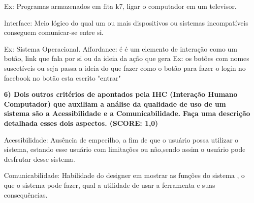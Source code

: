 \documentclass[
	article,			%
	11pt,				%
	oneside,			%
	a4paper,			%
	english,			%
	brazil,				%
	sumario=tradicional
	]{abntex2}
\begin{document}
Ex: Programas armazenados em fita k7, ligar o computador em um televisor.

Interface: Meio lógico do qual um ou mais dispositivos ou sistemas incompatíveis conseguem comunicar-se entre si.

Ex:  Sistema Operacional.
Affordance:  é  é um elemento de interação como um botão, link que fala por si ou da ideia da ação que gera
Ex: os botões com nomes suscetíveis ou seja passa a ideia do que fazer como o botão para fazer o login no facebook no botão esta escrito "entrar"

\textbf{6) Dois outros critérios de apontados pela IHC (Interação Humano Computador) que auxiliam a análise da qualidade de uso de um sistema são a Acessibilidade e a Comunicabilidade. Faça uma descrição detalhada esses dois aspectos. (SCORE: 1,0)}

Acessibilidade: Ausência de empecilho, a fim de que o usuário possa utilizar o sistema, estando esse usuário com limitações ou não,sendo assim o usuário pode desfrutar desse sistema.

Comunicabilidade: Habilidade do designer em mostrar as funções do sistema , o que o sistema pode fazer, qual a utilidade de usar a ferramenta e suas consequências.


\end{document}
